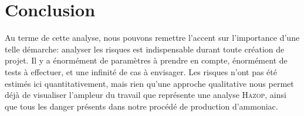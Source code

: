 \newpage
\section{Conclusion}
Au terme de cette analyse, nous pouvons remettre l'accent sur l'importance d'une telle démarche: analyser les risques est 
indispensable durant toute création de projet. Il y a énormément de paramètres à prendre en compte, énormément de tests à 
effectuer, et une infinité de cas à envisager. Les risques n'ont pas été estimés ici quantitativement, 
mais rien qu'une approche qualitative nous permet déjà de visualiser l'ampleur du travail que représente une 
analyse \textsc{Hazop}, ainsi que tous les danger présents dans notre procédé de production d'ammoniac.

\nocite{*}

